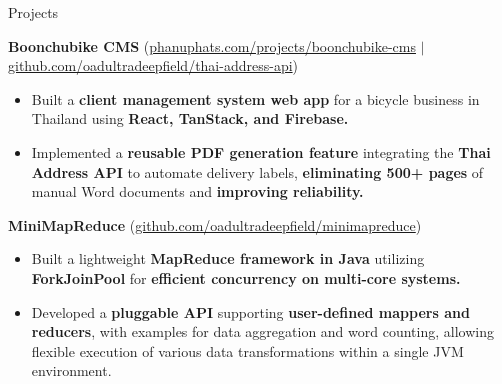 \documentclass{phanuphat_srisukhawasu_resume} %
\begin{document}

\begin{rSection}{Projects}

  \textbf{Boonchubike CMS} (\href{https://phanuphats.com/projects/boonchubike-cms}{phanuphats.com/projects/boonchubike-cms} $|$ \href{https://github.com/oadultradeepfield/thai-address-api}{github.com/oadultradeepfield/thai-address-api})
  \begin{itemize}
    \item Built a \textbf{client management system web app} for a bicycle business in Thailand using \textbf{React, TanStack, and Firebase.}
    \item Implemented a \textbf{reusable PDF generation feature} integrating the \textbf{Thai Address API} to automate delivery labels, \textbf{eliminating 500+ pages} of manual Word documents and \textbf{improving reliability.}
  \end{itemize}

  \textbf{MiniMapReduce} (\href{https://github.com/oadultradeepfield/minimapreduce}{github.com/oadultradeepfield/minimapreduce})
  \begin{itemize}
    \item Built a lightweight \textbf{MapReduce framework in Java} utilizing \textbf{ForkJoinPool} for \textbf{efficient concurrency on multi-core systems.}
    \item Developed a \textbf{pluggable API} supporting \textbf{user-defined mappers and reducers}, with examples for data aggregation and word counting, allowing flexible execution of various data transformations within a single JVM environment.
  \end{itemize}

\end{rSection}


\end{document}

